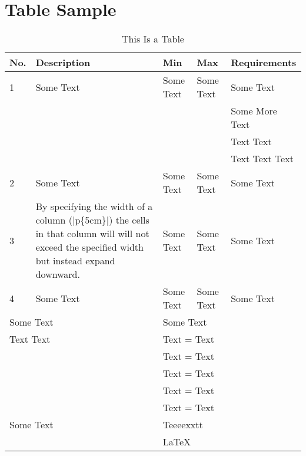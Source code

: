 \section{Table Sample}

\begin{table}[H]
\caption{This Is a Table\label{LABEL}}
\begin{tabular}{|l|p{5cm}|l|l|l|}
  \hline
  \textbf{No.}&\textbf{Description}&\textbf{Min}&\textbf{Max}&\textbf{Requirements}\\
  \hline
  1 & Some Text & Some Text & Some Text & Some Text\\
    &           &           &           & Some More Text\\
    &           &           &           & Text Text\\
    &           &           &           & Text Text Text\\
  \hline
  2 & Some Text & Some Text & Some Text & Some Text\\
  \hline
  3 & 	By specifying the width of a column (|p\{5cm\}|) the cells
  		in that column will will not exceed	the specified width    %
  		but instead expand downward.
  		
  		        & Some Text & Some Text & Some Text\\
  \hline
  4 & Some Text & Some Text & Some Text & Some Text\\
  \hline
  \multicolumn{2}{|l|}{Some Text} 	&	\multicolumn{3}{l|}{Some Text}\\
  \hline
  \multicolumn{2}{|l|}{Text Text} 	&	\multicolumn{3}{l|}{Text = Text}\\
  \multicolumn{2}{|l|}{}			&	\multicolumn{3}{l|}{Text = Text}\\
  \multicolumn{2}{|l|}{}			&	\multicolumn{3}{l|}{Text = Text}\\
  \multicolumn{2}{|l|}{}			&	\multicolumn{3}{l|}{Text = Text}\\
  \multicolumn{2}{|l|}{}			&	\multicolumn{3}{l|}{Text = Text}\\
  \hline
  \multicolumn{2}{|l|}{Some Text} 	&	\multicolumn{3}{l|}{Teeeexxtt}\\
  \multicolumn{2}{|l|}{}			&	\multicolumn{3}{l|}{\LaTeX}\\
  \hline      
\end{tabular}
\end{table}

\noindent
{}\\

\noindent
{}

\pagebreak